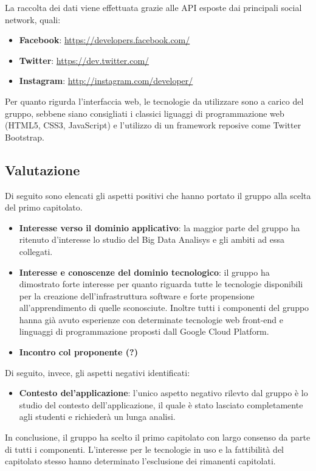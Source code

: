 La raccolta dei dati viene effettuata grazie alle API esposte dai principali social network, quali:
\begin{itemize}
\item \textbf{Facebook}: \url{https://developers.facebook.com/}
\item \textbf{Twitter}: \url{https://dev.twitter.com/}
\item \textbf{Instagram}: \url{http://instagram.com/developer/}
\end{itemize}
Per quanto rigurda l'interfaccia web, le tecnologie da utilizzare sono a carico del gruppo, sebbene siano consigliati i classici liguaggi di programmazione web (HTML5, CSS3, JavaScript) e l'utilizzo di un framework reposive come Twitter Bootstrap.
\subsection{Valutazione}
Di seguito sono elencati gli aspetti positivi che hanno portato il gruppo alla scelta del primo capitolato.
\begin{itemize}
\item \textbf{Interesse verso il dominio applicativo}: la maggior parte del gruppo ha ritenuto d'interesse lo studio del Big Data Analisys e gli ambiti ad essa collegati.
\item \textbf{Interesse e conoscenze del dominio tecnologico}: il gruppo ha dimostrato forte interesse per quanto riguarda tutte le tecnologie disponibili per la creazione dell'infrastruttura software e forte propensione all'apprendimento di quelle sconosciute. Inoltre tutti i componenti del gruppo hanna già avuto esperienze con determinate tecnologie web front-end e linguaggi di programmazione proposti dall Google Cloud Platform.
\item \textbf{Incontro col proponente (?)}
\end{itemize}
Di seguito, invece, gli aspetti negativi identificati:
\begin{itemize}
\item \textbf{Contesto del'applicazione}: l'unico aspetto negativo rilevto dal gruppo è lo studio del contesto dell'applicazione, il quale è stato lasciato completamente agli studenti e richiederà un lunga analisi.
\end{itemize}
In conclusione, il gruppo ha scelto il primo capitolato con largo consenso da parte di tutti i componenti. L'interesse per le tecnologie in uso e la fattibilità del capitolato stesso hanno determinato l'esclusione dei rimanenti capitolati.





